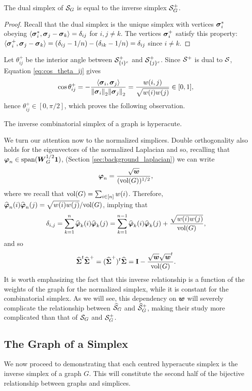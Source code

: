 \begin{observation}
	\label{obs:inverse_is_dual}
	The dual simplex of $\mathcal{S}_G$ is equal to the inverse simplex $\mathcal{S}_G^+$. 
\end{observation}
\begin{proof}
	Recall that the dual simplex is the unique simplex with vertices $\vb*{\sigma}_i^*$ obeying $\langle \vb*{\sigma}_i^*,\vb*{\sigma}_j-\vb*{\sigma}_k\rangle = \delta_{ij}$ for $i,j\neq k$. The vertices $\vb*{\sigma}_i^+$ satisfy this property: $\langle \vb*{\sigma}_i^+,\vb*{\sigma}_j-\vb*{\sigma}_k\rangle = (\delta_{ij}-1/n) - (\delta_{ik} - 1/n) = \delta_{ij}$ since $i\neq k$. 
\end{proof}
Let $\theta^+_{ij}$ be the interior angle between $\mathcal{S}^+_{\{i\}^c}$ and $\mathcal{S}^+_{\{j\}^c}$. Since $\mathcal{S}^+$ is dual to $\mathcal{S}$, Equation \eqref{eq:cos_theta_ij} gives 
\[\cos\theta_{ij}^+ = - \frac{\langle \vb*{\sigma}_i,\vb*{\sigma}_j\rangle}{\norm{\vb*{\sigma}_i}_2\norm{\vb*{\sigma}_j}_2} = \frac{w(i,j)}{\sqrt{w(i)w(j)}}\in[0,1],\]
hence $\theta^+_{ij}\in[0,\pi/2]$, which proves the following observation. 

\begin{observation}
	\label{obs:S^+_hyperacute}
	The inverse combinatorial simplex of a graph is hyperacute. 
\end{observation}

We turn our attention now to the normalized simplices. Double orthogonality also holds for the eigenvectors of the normalized Laplacian and so, recalling that $\vb*{\varphi}_n \in \textnormal{span}(\vb*{W}_G^{1/2}\vb{1} )$, 
(Section \ref{sec:background_laplacian}) 
we can write 
\[\vb*{\varphi}_n = \frac{\sqrt{\vb*{w}}}{(\textnormal{vol}(G))^{1/2}},\]
where we recall that $\textnormal{vol}(G)=\sum_{i\in[n]} w(i)$. 
Therefore, $\widehat{\vb*{\varphi}}_{n}(i)\widehat{\vb*{\varphi}}_{n}(j)=\sqrt{w(i)w(j)}/\textnormal{vol}(G)$, implying that 
\begin{equation*}\delta_{i,j}=\sum_{k=1}^n \widehat{\vb*{\varphi}}_k(i)\widehat{\vb*{\varphi}}_k(j) = \sum_{k=1}^{n-1} \widehat{\vb*{\varphi}}_k(i)\widehat{\vb*{\varphi}}_k(j) + \frac{\sqrt{w(i)w(j)}}{\textnormal{vol}(G)},
\end{equation*}
and so 
\begin{equation}
\label{eq:svn+svn}
\widehat{\boldsymbol{\Sigma}}^t\widehat{\boldsymbol{\Sigma}}^+=(\widehat{\boldsymbol{\Sigma}}^+)^t\widehat{\boldsymbol{\Sigma}}=\vb{I}-\frac{\sqrt{\vb*{w}}\sqrt{\vb*{w}}^t}{\textnormal{vol}(G)}.
\end{equation}
It is worth emphasizing the fact that this inverse relationship is a function of the weights of the graph for the normalized simplex, while it is constant for the combinatorial simplex. As we will see, this dependency on $\vb*{w}$ will severely complicate the relationship between $\widehat{\mathcal{S}}_G$ and $\widehat{\mathcal{S}}_G^+$, making their study more complicated than that of $\mathcal{S}_G$ and $\mathcal{S}_G^+$. 


\subsection{The Graph of a Simplex}
\label{sec:simplex_to_graph}
We now proceed to demonstrating that  each centred hyperacute simplex is the inverse simplex of a graph $G$. This will constitute the second half of the bijective relationship between graphs and simplices. 


